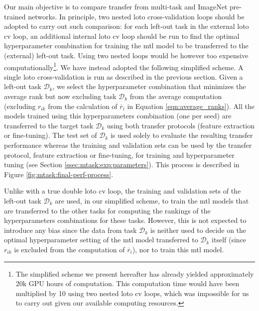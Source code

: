 Our main objective is to compare transfer from multi-task and ImageNet pre-trained networks. In principle, two nested \acrshort{loto} cross-validation loops should be adopted to carry out such comparison:  for each left-out task in the external \acrshort{loto} \acrshort{cv} loop, an additional internal \acrshort{loto} \acrshort{cv} loop should be run to find the optimal hyperparameter combination for training the \acrshort{mtl} model to be transferred to the (external) left-out task. Using two nested loops would be however too expensive computationally\footnote{The simplified scheme we present hereafter has already yielded approximately 20k GPU hours of computation. This computation time would have been multiplied by 10 using two nested \acrshort{loto} \acrshort{cv} loops, which was impossible for us to carry out given our available computing resources.}. We have instead adopted the following simplified scheme. A single \acrshort{loto} cross-validation is run as described in the previous section. Given a left-out task $\mathcal{D}_k$, we select the hyperparameter combination that minimizes the average rank but now excluding task $\mathcal{D}_k$ from the average computation (\ie excluding $r_{ik}$ from the calculation of $\overline{r}_i$ in Equation \ref{eqn:average_ranks}). All the models trained using this hyperparameters combination (\ie one per seed) are transferred to the target task $\mathcal{D}_k$ using both transfer protocols (\ie feature extraction or fine-tuning). The test set of $\mathcal{D}_k$ is used solely to evaluate the resulting transfer performance whereas the training and validation sets can be used by the transfer protocol, feature extraction or fine-tuning, for training and hyperparameter tuning (see Section \ref{ssec:mtask:exp:parameters}). This process is described in Figure \ref{fig:mtask:final-perf-process}.

Unlike with a true double \acrshort{loto} \acrshort{cv} loop, the training and validation sets of the left-out task $\mathcal{D}_k$ are used, in our simplified scheme, to train the \acrshort{mtl} models that are transferred to the other tasks for computing the rankings of the hyperparameters combinations for these tasks. However, this is not expected to introduce any bias since the data from task $\mathcal{D}_k$ is neither used to decide on the optimal hyperparameter setting of the \acrshort{mtl} model transferred to $\mathcal{D}_k$ itself (since $r_{ik}$ is excluded from the computation of $\overline{r}_i$), nor to train this \acrshort{mtl} model.

